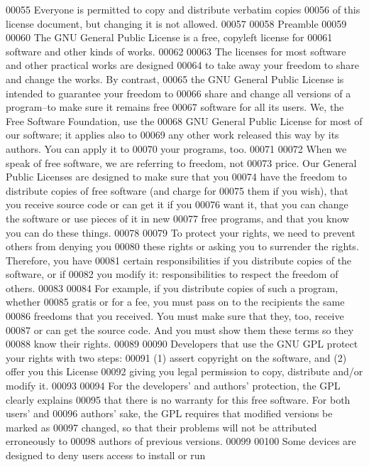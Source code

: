 \begin{DoxyCode}
00055  Everyone is permitted to copy and distribute verbatim copies
00056  of this license document, but changing it is not allowed.
00057 
00058                             Preamble
00059 
00060   The GNU General Public License is a free, copyleft license for
00061 software and other kinds of works.
00062 
00063   The licenses for most software and other practical works are designed
00064 to take away your freedom to share and change the works.  By contrast,
00065 the GNU General Public License is intended to guarantee your freedom to
00066 share and change all versions of a program--to make sure it remains free
00067 software for all its users.  We, the Free Software Foundation, use the
00068 GNU General Public License for most of our software; it applies also to
00069 any other work released this way by its authors.  You can apply it to
00070 your programs, too.
00071 
00072   When we speak of free software, we are referring to freedom, not
00073 price.  Our General Public Licenses are designed to make sure that you
00074 have the freedom to distribute copies of free software (and charge for
00075 them if you wish), that you receive source code or can get it if you
00076 want it, that you can change the software or use pieces of it in new
00077 free programs, and that you know you can do these things.
00078 
00079   To protect your rights, we need to prevent others from denying you
00080 these rights or asking you to surrender the rights.  Therefore, you have
00081 certain responsibilities if you distribute copies of the software, or if
00082 you modify it: responsibilities to respect the freedom of others.
00083 
00084   For example, if you distribute copies of such a program, whether
00085 gratis or for a fee, you must pass on to the recipients the same
00086 freedoms that you received.  You must make sure that they, too, receive
00087 or can get the source code.  And you must show them these terms so they
00088 know their rights.
00089 
00090   Developers that use the GNU GPL protect your rights with two steps:
00091 (1) assert copyright on the software, and (2) offer you this License
00092 giving you legal permission to copy, distribute and/or modify it.
00093 
00094   For the developers' and authors' protection, the GPL clearly explains
00095 that there is no warranty for this free software.  For both users' and
00096 authors' sake, the GPL requires that modified versions be marked as
00097 changed, so that their problems will not be attributed erroneously to
00098 authors of previous versions.
00099 
00100   Some devices are designed to deny users access to install or run

\end{DoxyCode}
